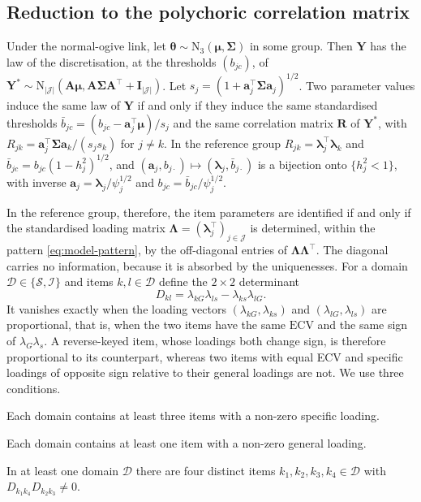 \subsection{Reduction to the polychoric correlation matrix}\label{sec:id-reduction}

\begin{lemma}\label{lem:id-reduction}
Under the normal-ogive link, let $\bm\theta\sim\mathrm N_3(\bm\mu,\bm\Sigma)$ in some group. Then $\bm Y$ has the law of the discretisation, at the thresholds $(b_{jc})$, of $\bm Y^*\sim\mathrm N_{|\mathcal J|}(\bm A\bm\mu,\bm A\bm\Sigma\bm A^\top+\bm I_{|\mathcal J|})$. Let $s_j=(1+\bm a_j^\top\bm\Sigma\bm a_j)^{1/2}$. Two parameter values induce the same law of $\bm Y$ if and only if they induce the same standardised thresholds $\bar b_{jc}=(b_{jc}-\bm a_j^\top\bm\mu)/s_j$ and the same correlation matrix $\bm R$ of $\bm Y^*$, with $R_{jk}=\bm a_j^\top\bm\Sigma\bm a_k/(s_js_k)$ for $j\neq k$. In the reference group $R_{jk}=\bm\lambda_j^\top\bm\lambda_k$ and $\bar b_{jc}=b_{jc}(1-h_j^2)^{1/2}$, and $(\bm a_j,b_{j\cdot})\mapsto(\bm\lambda_j,\bar b_{j\cdot})$ is a bijection onto $\{h_j^2<1\}$, with inverse $\bm a_j=\bm\lambda_j/\psi_j^{1/2}$ and $b_{jc}=\bar b_{jc}/\psi_j^{1/2}$.
\end{lemma}

In the reference group, therefore, the item parameters are identified if and only if the standardised loading matrix $\bm\Lambda=(\bm\lambda_j^\top)_{j\in\mathcal J}$ is determined, within the pattern \eqref{eq:model-pattern}, by the off-diagonal entries of $\bm\Lambda\bm\Lambda^\top$. The diagonal carries no information, because it is absorbed by the uniquenesses. For a domain $\mathcal D\in\{\mathcal S,\mathcal I\}$ and items $k,l\in\mathcal D$ define the $2\times2$ determinant
\begin{equation}\label{eq:id-det}
  D_{kl}=\lambda_{kG}\lambda_{ls}-\lambda_{ks}\lambda_{lG}.
\end{equation}
It vanishes exactly when the loading vectors $(\lambda_{kG},\lambda_{ks})$ and $(\lambda_{lG},\lambda_{ls})$ are proportional, that is, when the two items have the same $\mathrm{ECV}$ and the same sign of $\lambda_{G}\lambda_{s}$. A reverse-keyed item, whose loadings both change sign, is therefore proportional to its counterpart, whereas two items with equal ECV and specific loadings of opposite sign relative to their general loadings are not. We use three conditions.

\begin{assumption}\label{asm:id-spec}
Each domain contains at least three items with a non-zero specific loading.
\end{assumption}
\begin{assumption}\label{asm:id-gen}
Each domain contains at least one item with a non-zero general loading.
\end{assumption}
\begin{assumption}\label{asm:id-het}
In at least one domain $\mathcal D$ there are four distinct items $k_1,k_2,k_3,k_4\in\mathcal D$ with $D_{k_1k_4}D_{k_2k_3}\neq0$.
\end{assumption}

